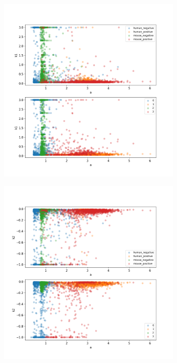 \begin{figure}
\begin{subfigure}{0.3\textwidth}
	\end{subfigure}
	\hfill
	\begin{subfigure}{0.3\textwidth}
		\includegraphics[width=\textwidth]{fig/seperate_a_k1}
	\end{subfigure}
	\hfill
	\begin{subfigure}{0.3\textwidth}
		\includegraphics[width=\textwidth]{fig/seperate_a_k2}

\end{subfigure}
\end{figure}
